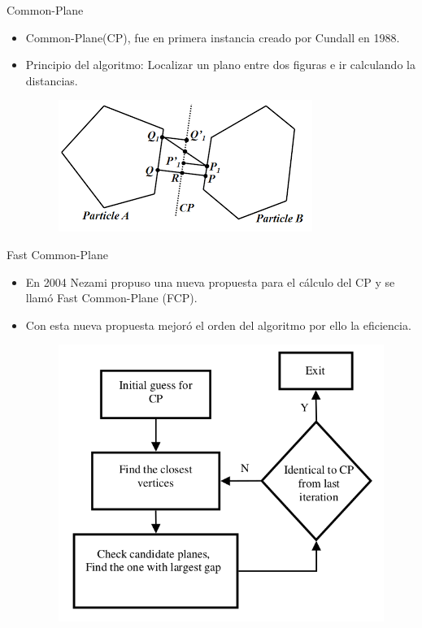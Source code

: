 \documentclass[11pt]{beamer}
\begin{document}
\begin{frame}{Common-Plane}
 \begin{itemize}
  \item Common-Plane(CP), fue en primera instancia creado por Cundall en 1988.
  \item Principio del algoritmo: Localizar un plano entre dos figuras e ir calculando la distancias.
  \begin{figure}[\centering]
  \includegraphics[width=0.5\linewidth]{img/CP}
  \end{figure}

 \end{itemize}
\end{frame}

\begin{frame}{Fast Common-Plane}
 \begin{itemize}
  \item En 2004 Nezami \cite{2004-Nezami} propuso una nueva propuesta para el cálculo del CP y se llamó Fast Common-Plane (FCP).
  \item Con esta nueva propuesta mejoró el orden del algoritmo por ello la eficiencia.
  \begin{figure}[\centering]
  \includegraphics[width = 0.5\linewidth]{img/Diagrama-FCP}
  \end{figure}

 \end{itemize}
\end{frame}
\end{document}
